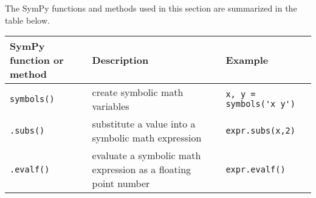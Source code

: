 \documentclass{book}
\newcommand{\passthrough}[1]{#1}
\begin{document}
    
        The SymPy functions and methods used in this section are summarized in
the table below.

\begin{longtable}[]{@{}lll@{}}
\toprule
\begin{minipage}[b]{0.30\columnwidth}\raggedright
SymPy function or method\strut
\end{minipage} & \begin{minipage}[b]{0.30\columnwidth}\raggedright
Description\strut
\end{minipage} & \begin{minipage}[b]{0.30\columnwidth}\raggedright
Example\strut
\end{minipage}\tabularnewline
\midrule
\endhead
\begin{minipage}[t]{0.30\columnwidth}\raggedright
\passthrough{\lstinline!symbols()!}\strut
\end{minipage} & \begin{minipage}[t]{0.30\columnwidth}\raggedright
create symbolic math variables\strut
\end{minipage} & \begin{minipage}[t]{0.30\columnwidth}\raggedright
\passthrough{\lstinline!x, y = symbols('x y')!}\strut
\end{minipage}\tabularnewline
\begin{minipage}[t]{0.30\columnwidth}\raggedright
\passthrough{\lstinline!.subs()!}\strut
\end{minipage} & \begin{minipage}[t]{0.30\columnwidth}\raggedright
substitute a value into a symbolic math expression\strut
\end{minipage} & \begin{minipage}[t]{0.30\columnwidth}\raggedright
\passthrough{\lstinline!expr.subs(x,2)!}\strut
\end{minipage}\tabularnewline
\begin{minipage}[t]{0.30\columnwidth}\raggedright
\passthrough{\lstinline!.evalf()!}\strut
\end{minipage} & \begin{minipage}[t]{0.30\columnwidth}\raggedright
evaluate a symbolic math expression as a floating point number\strut
\end{minipage} & \begin{minipage}[t]{0.30\columnwidth}\raggedright
\passthrough{\lstinline!expr.evalf()!}\strut
\end{minipage}\tabularnewline
\bottomrule
\end{longtable}
    
\end{document}
